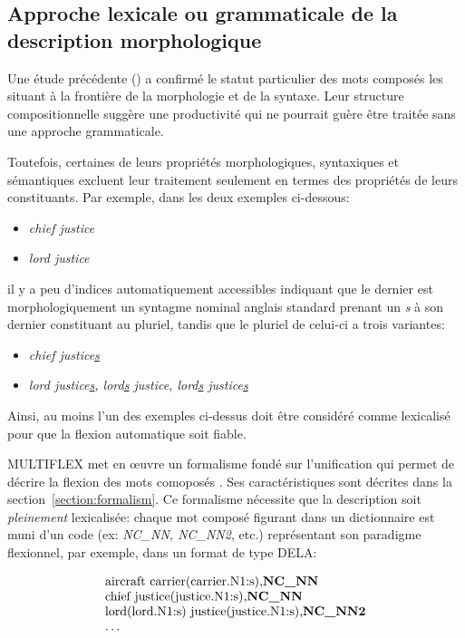 \subsection{Approche lexicale ou grammaticale de la description morphologique}
Une étude précédente (\cite{these-Savary}) a confirmé le statut particulier des mots composés
les situant à la frontière de la morphologie et de la syntaxe. Leur structure compositionnelle
suggère une productivité qui ne pourrait guère être traitée sans une approche grammaticale. 

Toutefois, certaines de leurs propriétés morphologiques, syntaxiques et sémantiques excluent leur
traitement seulement en termes des propriétés de leurs constituants. Par exemple, dans les deux
exemples ci-dessous:

\begin{itemize}
\item \emph{chief justice}
\item \emph{lord justice}
\end{itemize} 

\noindent il y a peu d'indices automatiquement accessibles indiquant que le dernier est
morphologiquement un syntagme nominal anglais standard prenant un \emph{s} à son dernier constituant
au pluriel, tandis que le pluriel de celui-ci a trois variantes:
 
\begin{itemize}
\item \emph{chief justice\underline{s}}
\item \emph{lord justice\underline{s}, lord\underline{s} justice,
lord\underline{s} justice\underline{s}}
\end{itemize}
 
\bigskip
\noindent Ainsi, au moins l'un des exemples ci-dessus doit être considéré comme lexicalisé pour que
la flexion automatique soit fiable.

\bigskip
\noindent MULTIFLEX met en {\oe}uvre un formalisme fondé sur l'unification qui permet de décrire la
flexion des mots comoposés \cite{Savary05}. Ses caractéristiques sont décrites dans la
section~\ref{section:formalism}. Ce formalisme nécessite que la description soit \emph{pleinement}
lexicalisée: chaque mot composé figurant dans un dictionnaire est muni d'un code (ex: \emph{NC\_NN,
NC\_NN2}, etc.) représentant son paradigme flexionnel, par exemple, dans un format de type DELA:

\[
\begin{array}[c]{l}
  $aircraft carrier(carrier.N1:s),\textbf{NC\_NN}$ \\
  $chief justice(justice.N1:s),\textbf{NC\_NN}$ \\
  $lord(lord.N1:s) justice(justice.N1:s),\textbf{NC\_NN2}$ \\
  \dots
\end{array}
\]

